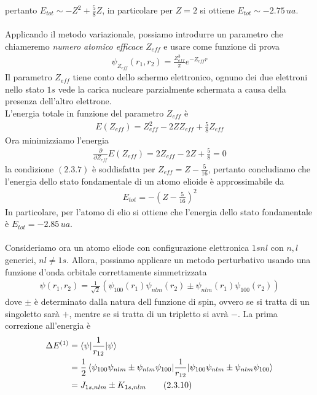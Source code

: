 \documentclass{article}
\begin{document}
pertanto $E_{tot} \sim -Z^2 + \frac{5}{8}Z$, in particolare per $Z = 2$ si ottiene $E_{tot} \sim -2.75 \, ua$. \\ \\
Applicando il metodo variazionale, possiamo introdurre un parametro che chiameremo \textit{numero atomico efficace} $Z_{eff}$ e usare come funzione di prova 
\begin{align}
    \psi_{Z_{eff}}(r_1, r_2) = \frac{Z^3_{eff}}{\pi}e^{-Z_{eff}r} \tag{2.3.5}
\end{align}
Il parametro $Z_{eff}$ tiene conto dello schermo elettronico, ognuno dei due elettroni nello stato $1s$ vede la carica nucleare parzialmente schermata a causa della presenza dell'altro elettrone. \\
L'energia totale in funzione del parametro $Z_{eff}$ è 
\begin{align}
    E(Z_{eff}) = Z^2_{eff} - 2ZZ_{eff} + \frac{5}{8}Z_{eff} \tag{2.3.6}
\end{align}
Ora minimizziamo l'energia 
\begin{align}
    \frac{\partial}{\partial Z_{eff}}E(Z_{eff}) = 2Z_{eff} - 2Z + \frac{5}{8} = 0 \tag{2.3.7}
\end{align}
la condizione $(2.3.7)$ è soddisfatta per $Z_{eff} = Z - \frac{5}{16}$, pertanto concludiamo che l'energia dello stato fondamentale di un atomo elioide è approssimabile da 
\begin{align}
    E_{tot} = -\left(Z - \frac{5}{16}\right)^2 \tag{2.3.8}
\end{align}
In particolare, per l'atomo di elio si ottiene che l'energia dello stato fondamentale è $E_{tot} = -2.85 \, ua$. \\ \\
Consideriamo ora un atomo eliode con configurazione elettronica $1snl$ con $n, l$ generici, $nl \neq 1s$. Allora, possiamo applicare un metodo perturbativo usando una funzione d'onda orbitale correttamente simmetrizzata 
\begin{align}
    \psi(r_1, r_2) = \frac{1}{\sqrt{2}}(\psi_{100}(r_1)\psi_{nlm}(r_2) \pm \psi_{nlm}(r_1)\psi_{100}(r_2)) \tag{2.3.9}
\end{align}
dove $\pm$ è determinato dalla natura dell funzione di spin, ovvero se si tratta di un singoletto sarà $+$, mentre se si tratta di un tripletto si avrà $-$. La prima correzione all'energia è 
\begin{align}
    \Delta E^{(1)} &= \braket{\psi|\frac{1}{r_{12}}|\psi} \notag \\
    &= \frac{1}{2}\braket{\psi_{100}\psi_{nlm} \pm \psi_{nlm}\psi_{100}|\frac{1}{r_{12}}|\psi_{100}\psi_{nlm} \pm \psi_{nlm}\psi_{100}} \notag \\
    &= J_{1s, nlm} \pm K_{1s, nlm} \tag{2.3.10}
\end{align}
\end{document}

